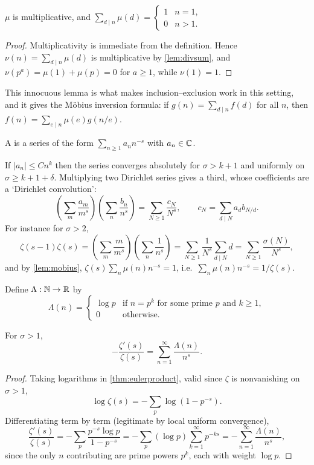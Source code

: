 \documentclass[a4paper]{scrartcl}
\begin{document}
\begin{lemma}\label{lem:mobius}
	$\mu$ is multiplicative, and $\displaystyle\sum_{d \mid n}\mu(d) = \begin{cases}1 & n = 1, \\ 0 & n > 1.\end{cases}$
\end{lemma}
\begin{proof}
	Multiplicativity is immediate from the definition. Hence $\nu(n) = \sum_{d\mid n}\mu(d)$ is multiplicative by \autoref{lem:divsum}, and $\nu(p^a) = \mu(1) + \mu(p) = 0$ for $a \geq 1$, while $\nu(1) = 1$.
\end{proof}

This innocuous lemma is what makes inclusion--exclusion work in this setting, and it gives the Möbius inversion formula: if $g(n) = \sum_{d \mid n}f(d)$ for all $n$, then $f(n) = \sum_{e \mid n}\mu(e)g(n/e)$.

\begin{definition}
	A  is a series of the form $\sum_{n \geq 1}a_n n^{-s}$ with $a_n \in \mathbb{C}$.
\end{definition}

If $|a_n| \leq Cn^k$ then the series converges absolutely for $\sigma > k+1$ and uniformly on $\sigma \geq k + 1 + \delta$. Multiplying two Dirichlet series gives a third, whose coefficients are a `Dirichlet convolution':
$$
\left(\sum_m \frac{a_m}{m^s}\right)\left(\sum_n\frac{b_n}{n^s}\right) = \sum_{N \geq 1}\frac{c_N}{N^s}, \qquad c_N = \sum_{d \mid N}a_d b_{N/d}.
$$
For instance for $\sigma > 2$,
$$
\zeta(s-1)\zeta(s) = \left(\sum_m \frac m{m^s}\right)\left(\sum_n\frac1{n^s}\right) = \sum_{N\geq1}\frac1{N^s}\sum_{d\mid N}d = \sum_{N\geq1}\frac{\sigma(N)}{N^s},
$$
and by \autoref{lem:mobius}, $\zeta(s)\sum_n \mu(n)n^{-s} = 1$, i.e.\ $\sum_n\mu(n)n^{-s} = 1/\zeta(s)$.

\begin{definition}
	Define $\Lambda : \mathbb{N} \to \mathbb{R}$ by
	$$
	\Lambda(n) = \begin{cases}\log p & \text{if } n = p^k \text{ for some prime } p \text{ and } k \geq 1, \\ 0 & \text{otherwise}.\end{cases}
	$$
\end{definition}

\begin{proposition}\label{prop:vonmangoldt}
	For $\sigma > 1$,
	$$
	-\frac{\zeta'(s)}{\zeta(s)} = \sum_{n=1}^\infty \frac{\Lambda(n)}{n^s}.
	$$
\end{proposition}
\begin{proof}
	Taking logarithms in \autoref{thm:eulerproduct}, valid since $\zeta$ is nonvanishing on $\sigma > 1$,
	$$
	\log\zeta(s) = -\sum_p \log\left(1 - p^{-s}\right).
	$$
	Differentiating term by term (legitimate by local uniform convergence),
	$$
	\frac{\zeta'(s)}{\zeta(s)} = -\sum_p \frac{p^{-s}\log p}{1 - p^{-s}} = -\sum_p (\log p)\sum_{k=1}^\infty p^{-ks} = -\sum_{n=1}^\infty \frac{\Lambda(n)}{n^s},
	$$
	since the only $n$ contributing are prime powers $p^k$, each with weight $\log p$.
\end{proof}
\end{document}
